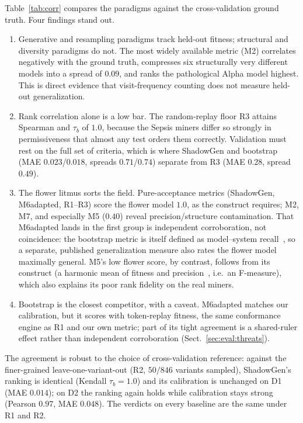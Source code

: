 \documentclass[runningheads]{llncs}
\newcommand{\chg}[1]{\textcolor{chgblue}{#1}}
\begin{document}
Table~\ref{tab:corr} compares the paradigms against the cross-validation ground truth. Four findings stand out.
\begin{enumerate}
  \item Generative and resampling paradigms track held-out fitness; structural and diversity paradigms do not. The most widely available metric (M2) correlates negatively with the ground truth, compresses six structurally very different models into a spread of \chg{$0.09$}, and ranks the pathological Alpha model highest. This is direct evidence that visit-frequency counting does not measure held-out generalization.
  \item Rank correlation alone is a low bar. The random-replay floor R3 attains Spearman and $\tau_b$ of $1.0$, because the Sepsis miners differ so strongly in permissiveness that almost any test orders them correctly. Validation must rest on the full set of criteria, which is where \chg{ShadowGen} and bootstrap (MAE $0.023$/\chg{$0.018$}, spreads $0.71$/$0.74$) separate from R3 (MAE $0.28$, spread $0.49$).
  \item The flower litmus sorts the field. Pure-acceptance metrics (\chg{ShadowGen}, M6adapted, R1--R3) score the flower model $1.0$, as the construct requires; M2, M7, and especially M5 ($0.40$) reveal precision/structure contamination. That M6adapted lands in the first group is independent corroboration, not coincidence: the bootstrap metric is itself defined as model--system recall~\cite{polyvyanyy2022bootstrap}, so a separate, published generalization measure also rates the flower model maximally general. M5's low flower score, by contrast, follows from its construct (a harmonic mean of fitness and precision~\cite{theis2020avatar}, i.e.\ an F-measure), which also explains its poor rank fidelity on the real miners.
  \item Bootstrap is the closest competitor, with a caveat. M6adapted matches our calibration, but it scores with token-replay fitness, the same conformance engine as R1 and our own metric; part of its tight agreement is a shared-ruler effect rather than independent corroboration (Sect.~\ref{sec:eval:threats}).
\end{enumerate}

The agreement is robust to the choice of cross-validation reference\chg{: against} the finer-grained leave-one-variant-out (R2\chg{, $50/846$ variants sampled}), ShadowGen's ranking is identical (Kendall $\tau_b{=}1.0$) and its calibration is unchanged on D1 (MAE $0.014$); on D2 the ranking again holds while calibration stays strong (Pearson $0.97$, MAE $0.048$). The verdicts on every baseline are the same under R1 and R2.
\end{document}
